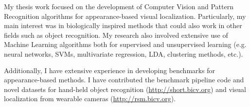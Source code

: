 My thesis work focused on the development of Computer Vision and Pattern Recognition algorithms for appearance-based visual localization. Particularly, my main interest was in biologically inspired methods that could also work in other fields such as object recognition. My research also involved extensive use of Machine Learning algorithms both for supervised and unsupervised learning (e.g. neural networks, SVMs, multivariate regression, LDA, clustering methods, etc.).

Additionally, I have extensive experience in developing benchmarks for appearance-based methods. I have contributed the benchmark pipeline code and novel datasets for hand-held object recognition (\url{http://short.bicv.org}) and visual localization from wearable cameras (\url{http://rsm.bicv.org}).

